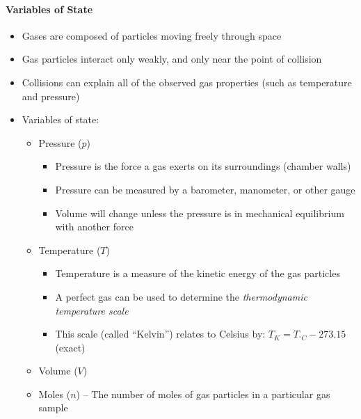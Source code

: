 \documentclass[12pt, openany, letterpaper]{memoir}
\begin{document}
\paragraph{Variables of State}
\begin{itemize}
	\item Gases are composed of particles moving freely through space
	\item Gas particles interact only weakly, and only near the point of collision
	\item Collisions can explain all of the observed gas properties (such as temperature and pressure)
	\item Variables of state:
	      \begin{itemize}
		      \item Pressure ($p$)
		            \begin{itemize}
			            \item Pressure is the force a gas exerts on its surroundings (chamber walls)
			            \item Pressure can be measured by a barometer, manometer, or other gauge
			            \item Volume will change unless the pressure is in mechanical equilibrium with another force
		            \end{itemize}
		      \item Temperature ($T$)
		            \begin{itemize}
			            \item Temperature is a measure of the kinetic energy of the gas particles
			            \item A perfect gas can be used to determine the \emph{thermodynamic temperature scale}
			            \item This scale (called ``Kelvin'') relates to Celsius by: $T_K = T_{^\circ C} - 273.15$ (exact)
		            \end{itemize}
		      \item Volume ($V$)
		      \item Moles ($n$) -- The number of moles of gas particles in a particular gas sample
	      \end{itemize}
\end{itemize}
\end{document}
